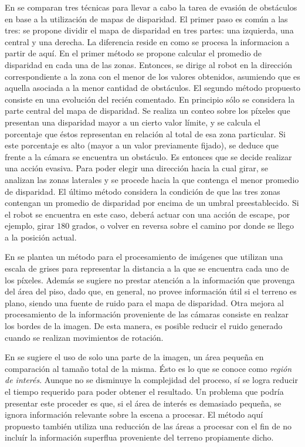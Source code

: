 \documentclass[journal]{IEEEtran}
\begin{document}
En \cite{KNG10} se comparan tres t\'ecnicas para llevar a cabo la tarea de evasi\'on de obst\'aculos en base a la utilizaci\'on de mapas de disparidad. El primer paso es com\'un a las tres: se propone dividir el mapa de disparidad en tres partes: una izquierda, una central y una derecha. La diferencia reside en como se procesa la informacion a partir de aqu\'i. En el primer m\'etodo se propone calcular el promedio de disparidad en cada una de las zonas. Entonces, se dirige al robot en la direcci\'on correspondiente a la zona con el menor de los valores obtenidos, asumiendo que es aquella asociada a la menor cantidad de obst\'aculos. El segundo m\'etodo propuesto consiste en una evoluci\'on del reci\'en comentado. En principio s\'olo se considera la parte central del mapa de disparidad. Se realiza un conteo sobre los p\'ixeles que presentan una disparidad mayor a un cierto valor l\'imite, y se calcula el porcentaje que \'estos representan en relaci\'on al total de esa zona particular. Si este porcentaje es alto (mayor a un valor previamente fijado), se deduce que frente a la c\'amara se encuentra un obst\'aculo. Es entonces que se decide realizar una acci\'on evasiva. Para poder elegir una direcci\'on hacia la cual girar, se analizan las zonas laterales y se procede hacia la que contenga el menor promedio de disparidad. El \'ultimo m\'etodo considera la condici\'on de que las tres zonas contengan un promedio de disparidad por encima de un umbral preestablecido. Si el robot se encuentra en este caso, deber\'a actuar con una acci\'on de escape, por ejemplo, girar $180$ grados, o volver en reversa sobre el camino por donde se llego a la posici\'on actual.

En \cite{RH04} se plantea un m\'etodo para el procesamiento de im\'agenes que utilizan una escala de grises para representar la distancia a la que se encuentra cada uno de los p\'ixeles. Adem\'as se sugiere no prestar atenci\'on a la informaci\'on que provenga del \'area del piso, dado que, en general, no provee informaci\'on \'util si el terreno es plano, siendo una fuente de ruido para el mapa de disparidad. Otra mejora al procesamiento de la informaci\'on proveniente de las c\'amaras consiste en realzar los bordes de la imagen. De esta manera, es posible reducir el ruido generado cuando se realizan movimientos de rotaci\'on.

En \cite{H09} se sugiere el uso de solo una parte de la imagen, un \'area peque\~na en comparaci\'on al tama\~no total de la misma. \'Esto es lo que se conoce como \emph{regi\'on de inter\'es}. Aunque no se disminuye la complejidad del proceso, s\'i se logra reducir el tiempo requerido para poder obtener el resultado. Un problema que podr\'ia presentar este proceder es que, si el \'area de inter\'es es demasiado peque\~na, se ignora informaci\'on relevante sobre la escena a procesar. El m\'etodo aqu\'i propuesto tambi\'en utiliza una reducci\'on de las \'areas a procesar con el fin de no inclu\'ir la informaci\'on superflua proveniente del terreno propiamente dicho.
\end{document}
